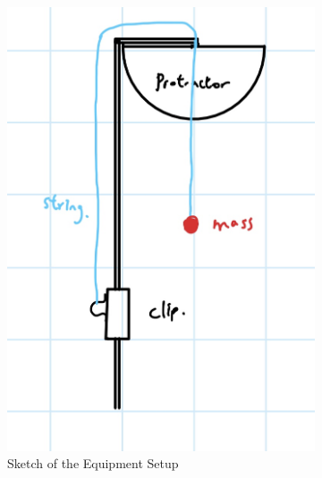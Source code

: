 \documentclass{article}
\begin{document}
\begin{figure}[h!]
    \centering
    \begin{subfigure}[t]{0.3\textwidth}
        \centering
        \includegraphics[width=\linewidth]{setup_sketch.png}
        \caption{Sketch of the Equipment Setup}
        \label{fig:sketch_setup}
    \end{subfigure}%
    \hfil 
    \begin{subfigure}[t]{0.2\textwidth}
        \centering

\end{subfigure}
\end{figure}
\end{document}
